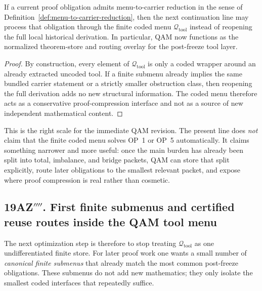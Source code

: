 \begin{proposition}
\label{prop:qam-reuse-principle-immediate-line}
If a current proof obligation admits menu-to-carrier reduction in the sense of Definition~\ref{def:menu-to-carrier-reduction}, then the next continuation line may process that obligation through the finite coded menu \(\mathcal Q_{\mathrm{tool}}\) instead of reopening the full local historical derivation. In particular, QAM now functions as the normalized theorem-store and routing overlay for the post-freeze tool layer.
\end{proposition}

\begin{proof}
By construction, every element of \(\mathcal Q_{\mathrm{tool}}\) is only a coded wrapper around an already extracted uncoded tool. If a finite submenu already implies the same bundled carrier statement or a strictly smaller obstruction class, then reopening the full derivation adds no new structural information. The coded menu therefore acts as a conservative proof-compression interface and not as a source of new independent mathematical content.
\end{proof}

\begin{remark}
\label{rem:qam-step-mathematically-honest}
This is the right scale for the immediate QAM revision. The present line does \emph{not} claim that the finite coded menu solves OP~1 or OP~5 automatically. It claims something narrower and more useful: once the main burden has already been split into total, imbalance, and bridge packets, QAM can store that split explicitly, route later obligations to the smallest relevant packet, and expose where proof compression is real rather than cosmetic.
\end{remark}


\subsection*{19AZ$''''$. First finite submenus and certified reuse routes inside the QAM tool menu}
\label{sec:first-finite-submenus-certified-reuse-routes}
The next optimization step is therefore to stop treating \(\mathcal Q_{\mathrm{tool}}\) as one undifferentiated finite store. For later proof work one wants a small number of \emph{canonical finite submenus} that already match the most common post-freeze obligations. These submenus do not add new mathematics; they only isolate the smallest coded interfaces that repeatedly suffice.

